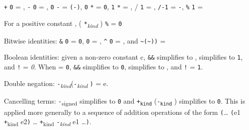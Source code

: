 \begin{compactenum}
\begin{compactenum}
    \begin{compactenum}
    \item
       \texttt{+} \texttt{0} = ,  \texttt{-}
      \texttt{0} = , \texttt{0} \texttt{-}  =
      \texttt{(-}\texttt{)}, \texttt{0} \texttt{*}  =
      \texttt{0}, \texttt{1} \texttt{*}  = ,  /
      \texttt{1} = , \texttt{/-1} = \texttt{-},
       \texttt{\%} \texttt{1} = 
    \item
      For a positive constant , (
      \texttt{*}\emph{\textsubscript{kind}} ) \texttt{\%}
       = \texttt{0}
    \end{compactenum}
  \item
    Bitwise identities:  \texttt{\&} \texttt{0} = \texttt{0},
     \texttt{\textbar{}} \texttt{0} = , 
    \texttt{\^{}} \texttt{0} = , and
    \texttt{\textasciitilde{}(\textasciitilde{}}\texttt{))} =
  \item
    Boolean identities: given a non-zero constant c, 
    \texttt{\&\&}  simplifies to , 
    \texttt{\textbar{}\textbar{}}  simplifies to \texttt{1}, and
    \texttt{!} = \emph{0}. When  = \texttt{0}, 
    \texttt{\&\&}  simplifies to \texttt{0}, 
    \texttt{\textbar{}\textbar{}}  simplifies to , and
    \texttt{!} = \texttt{1}.
  \item
    Double negation:
    \texttt{-}\emph{\textsubscript{kind}}(\texttt{-}\emph{\textsubscript{kind}}
    \texttt{)} = e.
  \item
    Cancelling terms:  \texttt{-}\textsubscript{signed} 
    simplifies to \texttt{0} and  \texttt{+\textsubscript{kind}}
    (\texttt{-\textsubscript{kind}} ) simplifies to \texttt{0}.
    This is applied more generally to a sequence of addition operations
    of the form \texttt{(}\ldots{} \texttt{(}e1
    \texttt{+}\textsubscript{kind} e2\texttt{)} \ldots{}
    \texttt{+}\textsubscript{kind} \texttt{-}\emph{\textsubscript{kind}}
    e1 \ldots{}\texttt{)}.


\end{compactenum}
\end{compactenum}
